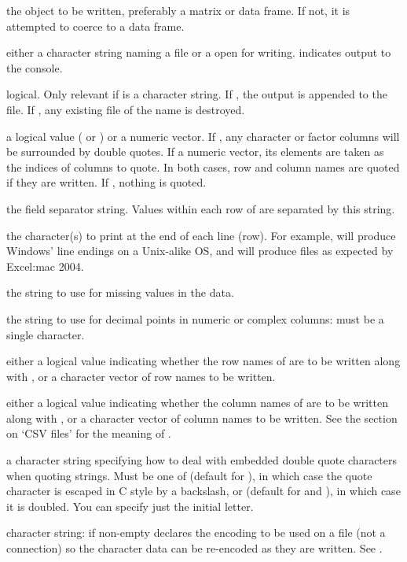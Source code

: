 %
\begin{Arguments}
\begin{ldescription}
\item[\code{x}] the object to be written, preferably a matrix or data frame.
If not, it is attempted to coerce  to a data frame.
\item[\code{file}] either a character string naming a file or a 
open for writing.   indicates output to the console.
\item[\code{append}] logical. Only relevant if  is a character
string.  If , the output is appended to the
file.  If , any existing file of the name is destroyed.
\item[\code{quote}] a logical value ( or ) or a
numeric vector.  If , any character or factor columns
will be surrounded by double quotes.  If a numeric vector, its
elements are taken as the indices of columns to quote.  In both
cases, row and column names are quoted if they are written.  If
, nothing is quoted.
\item[\code{sep}] the field separator string.  Values within each row of
 are separated by this string.
\item[\code{eol}] the character(s) to print at the end of each line (row).
For example,  will produce Windows' line endings on
a Unix-alike OS, and  will produce files as expected by
Excel:mac 2004.
\item[\code{na}] the string to use for missing values in the data.
\item[\code{dec}] the string to use for decimal points in numeric or complex
columns: must be a single character.
\item[\code{row.names}] either a logical value indicating whether the row
names of  are to be written along with , or a
character vector of row names to be written.
\item[\code{col.names}] either a logical value indicating whether the column
names of  are to be written along with , or a
character vector of column names to be written.  See the section on
`CSV files' for the meaning of .
\item[\code{qmethod}] a character string specifying how to deal with embedded
double quote characters when quoting strings.  Must be one of
 (default for ), in which case the
quote character is escaped in C style by a backslash, or
 (default for  and
), in which case it is doubled.  You can specify
just the initial letter.
\item[\code{fileEncoding}] character string: if non-empty declares the
encoding to be used on a file (not a connection) so the character data can
be re-encoded as they are written.  See .


\end{ldescription}
\end{Arguments}
